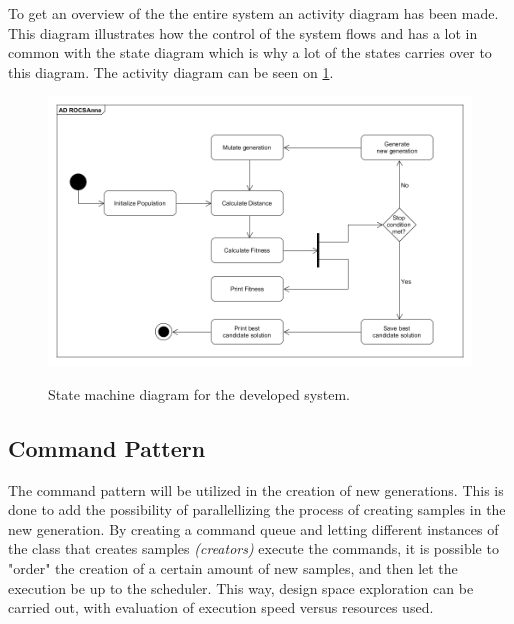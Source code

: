 To get an overview of the the entire system an activity diagram has been made. This diagram illustrates how the control of the system flows and has a lot in common with the state diagram which is why a lot of the states carries over to this diagram. The activity diagram can be seen on \cref{fig:Activity_diagram}.

\begin{figure}[H]
	\centering
	{\includegraphics[width=\textwidth]{Images/AD_ROGSAnne.PNG}}\\[0.5cm]
	\caption{State machine diagram for the developed system.}
	\label{fig:Activity_diagram}
\end{figure}



\subsection{Command Pattern}
The command pattern will be utilized in the creation of new generations. This is done to add the possibility of parallellizing the process of creating samples in the new generation. By creating a command queue and letting different instances of the class that creates samples \textit{(creators)} execute the commands, it is possible to "order" the creation of a certain amount of new samples, and then let the execution be up to the scheduler. This way, design space exploration can be carried out, with evaluation of execution speed versus resources used.